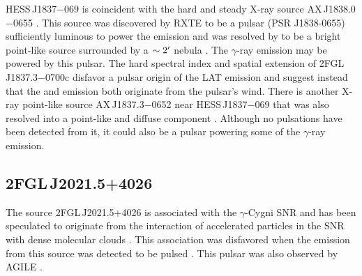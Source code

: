 HESS\,J1837$-$069 is coincident with the hard and steady X-ray source
AX\,J1838.0$-$0655 \citep{bamba_2003a_diffuse-x-ray}.  This source
was discovered by RXTE to be a pulsar (PSR J1838-0655) sufficiently
luminous to power the \tev emission and was resolved by \chandra
to be a bright point-like source surrounded by a $\sim2\mbox{$^\prime$}$
nebula \citep{gotthelf_2008a_discovery-young}. The $\gamma$-ray
emission may be powered by this pulsar.  The hard spectral index
and spatial extension of 2FGL\,J1837.3$-$0700c disfavor a pulsar
origin of the LAT emission and suggest instead that the \gev and \tev
emission both originate from the pulsar's wind.  There is another
X-ray point-like source AX\,J1837.3$-$0652 near HESS\,J1837$-$069
\citep{bamba_2003a_diffuse-x-ray} that was also resolved into a point-like
and diffuse component \citep{gotthelf_2008a_discovery-young}.  Although no
pulsations have been detected from it, it could also be a pulsar powering
some of the $\gamma$-ray emission.

\subsection{2FGL\,J2021.5+4026}

The source 2FGL\,J2021.5+4026 is associated with the $\gamma$-Cygni
SNR and has been speculated to originate from the interaction
of accelerated particles in the SNR with dense molecular clouds
\citep{pollock_1985a_probable-identification,gaisser_1998a_gamma-ray-production}.
This association was disfavored when the \gev
emission from this source was detected to be pulsed
\citep[PSR\,J2021+4026,][]{abdo_2010a_first-fermi}.  This pulsar was
also observed by AGILE \citep{chen_2011a_study-gamma-ray}.

